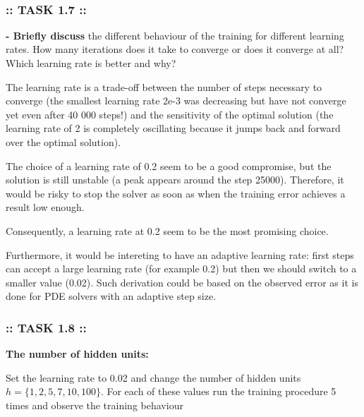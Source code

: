 \documentclass[11pt]{article}
\begin{document}
    \begin{center}
    \end{center}
    { \hspace*{\fill} \\}
    
    \hypertarget{task-1.7}{%
\subsubsection{:: TASK 1.7 ::}\label{task-1.7}}

\textbf{- Briefly discuss} the different behaviour of the training for
different learning rates. How many iterations does it take to converge
or does it converge at all? Which learning rate is better and why?

    The learning rate is a trade-off between the number of steps necessary
to converge (the smallest learning rate 2e-3 was decreasing but have not
converge yet even after 40 000 steps!) and the sensitivity of the
optimal solution (the learning rate of 2 is completely oscillating
because it jumps back and forward over the optimal solution).

The choice of a learning rate of 0.2 seem to be a good compromise, but
the solution is still unstable (a peak appears around the step 25000).
Therefore, it would be risky to stop the solver as soon as when the
training error achieves a result low enough.

Consequently, a learning rate at 0.2 seem to be the most promising
choice.

Furthermore, it would be intereting to have an adaptive learning rate:
first steps can accept a large learning rate (for example 0.2) but then
we should switch to a smaller value (0.02). Such derivation could be
based on the observed error as it is done for PDE solvers with an
adaptive step size.

    \hypertarget{task-1.8}{%
\subsubsection{:: TASK 1.8 ::}\label{task-1.8}}

\textbf{The number of hidden units:}

Set the learning rate to 0.02 and change the number of hidden units
\(h = \{1, 2, 5, 7, 10, 100\}\). For each of these values run the
training procedure 5 times and observe the training behaviour
\end{document}

